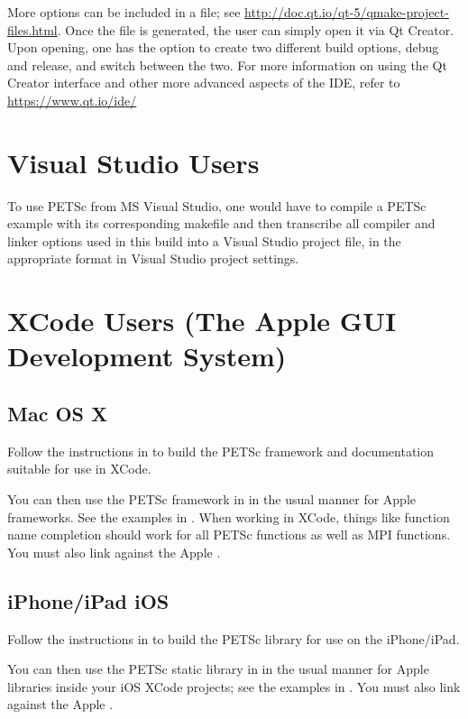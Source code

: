 {{More options can be included in a  file; see \url{http://doc.qt.io/qt-5/qmake-project-files.html}. 
Once the  file is generated, the user can simply open it via Qt Creator. 
Upon opening, one has the option to create two different build options, debug and release, and switch between the two. 
For more information on using the Qt Creator interface and other more advanced aspects of the IDE, refer to \url{https://www.qt.io/ide/}

\section{Visual Studio Users} 

To use PETSc from MS Visual Studio, one would have to compile a PETSc example with its corresponding makefile and then transcribe all compiler and linker options used in this build into a Visual Studio project file, in the appropriate format in Visual Studio project settings. 

\section{XCode Users (The Apple GUI Development System)} 
\subsection{Mac OS X}

Follow the instructions in  to build the PETSc framework and documentation suitable for use in XCode.

You can then use the PETSc framework in  in the usual manner for Apple frameworks.
See the examples in .  When working in XCode, things like function name completion should work for all PETSc functions as well as MPI functions. You must also link against the Apple .

\subsection{iPhone/iPad iOS}

Follow the instructions in  to build the PETSc library for use on the iPhone/iPad.

You can then use the PETSc static library in  in the usual manner for Apple libraries inside your iOS XCode projects; see the examples in .  You must also link against the Apple .

}}
